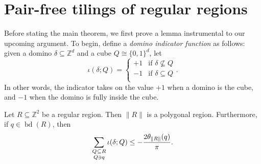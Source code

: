 \section{Pair-free tilings of regular regions}\label{sec:main}
Before stating the main theorem, we first prove a lemma instrumental to our upcoming argument.
To begin, define a \emph{domino indicator function} as follows: given a domino $\delta \subseteq \mathbb{Z}^d$ and a cube $Q \cong \{0,1\}^d$, let 
\begin{equation}
  \iota(\delta; Q) =
  \begin{cases}
    +1 &\text{if } \delta \not\subseteq Q \\
    -1 &\text{if } \delta \subseteq Q  \\
  \end{cases}.
\end{equation}
In other words, the indicator takes on the value $+1$ when a domino is  the cube, and $-1$ when the domino is fully inside the cube.
\begin{lemma}\label{lem:exterior-angle}
  Let $R \subseteq \mathbb{Z}^2$ be a regular region. Then $\lVert R \rVert$ is a polygonal region. Furthermore, if $q \in \operatorname{bd}(R)$, then
  \begin{equation}\label{eq:flux-inequality}
    \sum_{\substack{Q \mskip 1mu \subseteq \mskip 0.3mu R \\[0.2ex] Q \ni q}} \iota(\delta; Q) \leq -\frac{2\theta_{\lVert R \rVert}(q)}{\pi}.
  \end{equation}
\end{lemma}

